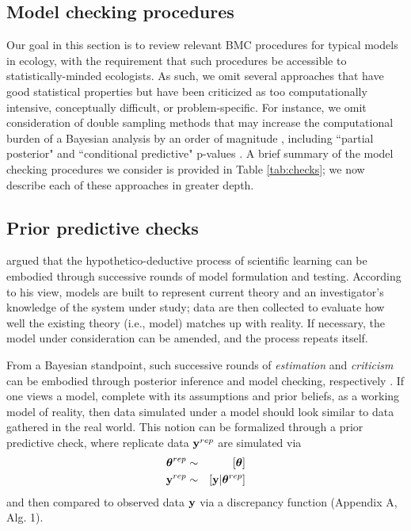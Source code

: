\documentclass[12pt,english]{article}
\begin{document}
\begin{spacing}{1.9}
\section{Model checking procedures}

Our goal in this section is to review relevant BMC
procedures for typical models in ecology, with the requirement that
such procedures be accessible to statistically-minded ecologists.  As
such, we omit several approaches that have good statistical properties
but have been criticized \citep[e.g.,][]{Johnson2007b,Zhang2014} as
too computationally intensive, conceptually difficult, or
problem-specific.  For
instance, we omit consideration of double sampling methods that may
increase the computational burden of a Bayesian analysis by an order
of magnitude \citep{Johnson2007b}, including ``partial posterior" and
``conditional predictive" p-values \citep[see
e.g.,][]{BayarriBerger1999,RobinsEtAl2000,BayarriCastellanos2007}.  A brief summary of
the model checking procedures we consider is provided in Table \ref{tab:checks}; we now describe
each of these approaches in greater depth.

\subsection{Prior predictive checks}

\citet{Box1980} argued that the hypothetico-deductive process of
scientific learning can be embodied through successive rounds of model
formulation and testing. According to his view, models are built to
represent current theory and an investigator's knowledge of the system
under study; data are then collected to evaluate how well the existing
theory (i.e., model) matches up with reality.  If necessary, the model
under consideration can be amended, and the process repeats itself.

From a Bayesian standpoint, such successive rounds of
\textit{estimation} and \textit{criticism} can be embodied through
posterior inference and model checking, respectively \citep{Box1980}.
If one views a model, complete with its assumptions and
prior beliefs, as a working model of reality, then data simulated
under a model should look similar to data gathered in the real world.
This notion can be formalized through a prior predictive check, where
replicate data ${\bf y}^{rep}$ are simulated via
\begin{eqnarray}
  \label{eq:prior}
  \boldsymbol{\theta}^{rep} & \sim & [\boldsymbol{\theta}] \\
  {\bf y}^{rep} & \sim & [{\bf y}|\boldsymbol{\theta}^{rep}] \nonumber
\end{eqnarray}
and then compared to observed data ${\bf y}$ via a discrepancy function
(Appendix A, Alg. 1).


\end{spacing}
\end{document}
